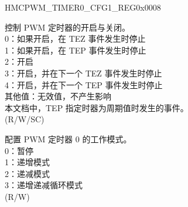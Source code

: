 \begin{register}{H}{MCPWM\_TIMER0\_CFG1\_REG}{0x0008}\label{regdesc:MCPWMTIMER0CFG1REG}
%
%
%
\regnewline%
\begin{regdesc}\begin{reglist}
\label{fielddesc:MCPWMTIMER0START}\item [MCPWM\_TIMER0\_START] 控制 PWM 定时器的开启与关闭。\\
0：如果开启，在 TEZ 事件发生时停止\\
1：如果开启，在 TEP 事件发生时停止\\
2：开启\\
3：开启，并在下一个 TEZ 事件发生时停止\\
4：开启，并在下一个 TEP 事件发生时停止\\
其他值：无效值，不产生影响\\
本文档中，TEP 指定时器为周期值时发生的事件。\\ (R/W/SC)
\label{fielddesc:MCPWMTIMER0MOD}\item [MCPWM\_TIMER0\_MOD] 配置 PWM 定时器 0 的工作模式。\\
0：暂停\\
1：递增模式\\
2：递减模式\\
3：递增递减循环模式\\
(R/W)
\end{reglist}\end{regdesc}
\end{register}


